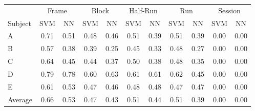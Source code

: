 
\begin{tabular}{l *{10}{c}}
\toprule
& \multicolumn{2}{c}{Frame} & \multicolumn{2}{c}{Block} & \multicolumn{2}{c}{Half-Run} & \multicolumn{2}{c}{Run} & \multicolumn{2}{c}{Session} \\
\cmidrule(lr){2-3} \cmidrule(rl){4-5} \cmidrule(rl){6-7} \cmidrule(rl){8-9} \cmidrule(l){10-11}
Subject & SVM & NN & SVM & NN & SVM & NN & SVM & NN & SVM & NN\\
\midrule
A & 0.71 & 0.51 & 0.48 & 0.46 & 0.51 & 0.39 & 0.51 & 0.39 & 0.00 & 0.00 \\
B & 0.57 & 0.38 & 0.39 & 0.25 & 0.45 & 0.33 & 0.48 & 0.27 & 0.00 & 0.00 \\
C & 0.64 & 0.45 & 0.44 & 0.37 & 0.50 & 0.38 & 0.48 & 0.35 & 0.00 & 0.00 \\
D & 0.79 & 0.78 & 0.60 & 0.63 & 0.61 & 0.61 & 0.62 & 0.45 & 0.00 & 0.00 \\
E & 0.61 & 0.53 & 0.47 & 0.46 & 0.48 & 0.48 & 0.47 & 0.47 & 0.00 & 0.00 \\
Average & 0.66 & 0.53 & 0.47 & 0.43 & 0.51 & 0.44 & 0.51 & 0.39 & 0.00 & 0.00 \\
\bottomrule
\end{tabular}
